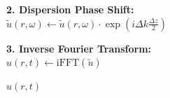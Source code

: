 \begin{algorithm}[H]
{{        \BlankLine
        \textbf{2. Dispersion Phase Shift:} \\
        $\tilde{u}(r, \omega) \gets \tilde{u}(r, \omega) \cdot \exp\left(i \Delta k \frac{\Delta z}{2}\right)$
        
        \BlankLine
        \textbf{3. Inverse Fourier Transform:} \\
        $u(r, t) \gets \text{iFFT}(\tilde{u})$
        
        \Return $u(r, t)$
    }
}

\caption{Linear Propagation Operators (\texttt{LinearOperator})}
\label{alg:linear_operator}
\end{algorithm}




\newpage


